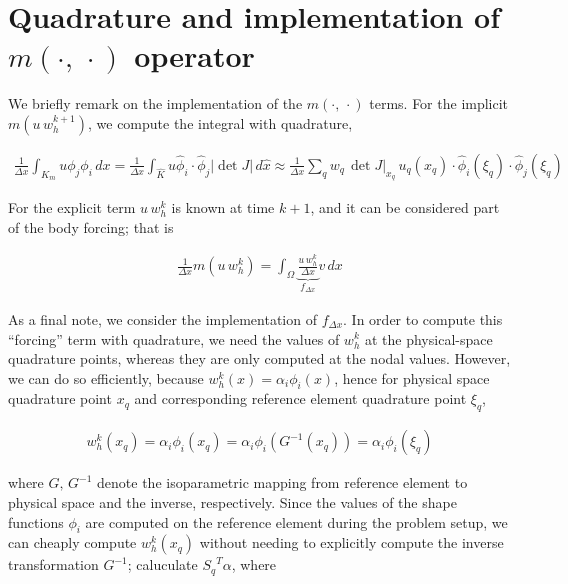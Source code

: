 \documentclass[10pt]{article}
\begin{document}
\section{Quadrature and implementation of $m(\cdot,\, \cdot)$ operator} \label{app:m_operator}
    We briefly remark on the implementation of the $m( \cdot ,\,  \cdot )$ terms.
    For the implicit $m(u\, w_h^{k+1})$, we compute the integral with quadrature, 

    \begin{align}
      \frac{1}{\Delta x}\int_{K_m} u \phi_j \phi_i\, dx 
        = \frac{1}{\Delta x} \int_{\hat{K}} u\widehat{\phi}_i \cdot \widehat{\phi}_j \left| \det
        J\right|\, d\widehat{x}
        \approx
        \frac{1}{\Delta x} \sum_q w_q\, \det J\big|_{x_q}\, u_q(x_q)  \cdot \widehat{\phi}_i(\xi_q) \cdot
        \widehat{\phi}_j(\xi_q) 
      \end{align}
    
    For the explicit term $u\, w_h^k$ is known at time $k+1$, and it can be considered part of the
    body forcing; that is

    \begin{align}
      \frac{1}{\Delta x} m(u\, w_h^k) =
      \int_{\Omega}^{} \underbrace{\frac{u\, w_h^k}{\Delta x}}_{f_{\Delta x}} v \, dx
    \end{align}

    As a final note, we consider the implementation of $f_{\Delta x}$. In order to compute this
    ``forcing'' term with quadrature, we need the values of $w_h^k$ at the physical-space quadrature
    points, whereas they are only computed at the nodal values. However, we can do so efficiently,
    because $w_h^k(x) = \alpha_i \phi_i(x)$, hence for physical space quadrature point $x_q$ and
    corresponding reference element quadrature point $\xi_q$,

    \begin{align}
      w_h^k(x_q) = \alpha_i \phi_i(x_q) 
      = \alpha_i \phi_i(G^{-1}(x_q)) 
      = \alpha_i \phi_i(\xi_q) 
    \end{align}

    where $G,\, G^{-1}$ denote the isoparametric mapping from reference element to physical space and
    the inverse, respectively. Since the values of the shape functions $\phi_i$ are computed on the
    reference element during the problem setup, we can cheaply compute $w_h^k(x_q)$ without needing
    to explicitly compute the inverse transformation $G^{-1}$; caluculate ${S_q}^T \alpha$, where
\end{document}
